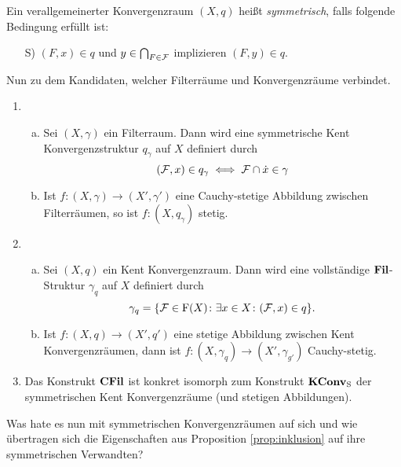 \begin{defn}
  Ein verallgemeinerter Konvergenzraum $(X,q)$ heißt \emph{symmetrisch}, falls folgende Bedingung erfüllt ist:
  \begin{enumerate}[S1)]
    \item[S)] $(F,x) \in q$ und $y \in \bigcap_{F \in \mathcal{F}}$ implizieren $(F, y) \in q$.
  \end{enumerate}
\end{defn}

Nun zu dem Kandidaten, welcher Filterräume und Konvergenzräume verbindet.

\begin{prop}
  \begin{enumerate}[1)]
    \item \begin{enumerate}[a)]  
        \item Sei $(X, \gamma)$ ein Filterraum. Dann wird eine symmetrische Kent Konvergenzstruktur $q_\gamma$ auf $X$ definiert durch
          $$
          (\mathcal{F}, x) \in q_\gamma \iff \mathcal{F} \cap \dot x \in \gamma
          $$
        \item Ist $f \colon (X, \gamma) \to (X', \gamma')$ eine Cauchy-stetige Abbildung zwischen Filterräumen, so ist $f \colon (X, q_\gamma)$ stetig.
      \end{enumerate}
    \item \begin{enumerate}[a)]
        \item Sei $(X, q)$ ein Kent Konvergenzraum. Dann wird eine vollständige $\mathbf{Fil}$-Struktur $\gamma_q$ auf $X$ definiert durch
          $$
          \gamma_q = \{ \mathcal{F} \in \mathrm{F}(X) \colon \exists x \in X \colon (\mathcal{F}, x ) \in q \}.
          $$
        \item Ist $f \colon (X, q) \to (X', q')$ eine stetige Abbildung zwischen Kent Konvergenzräumen, dann ist $f \colon (X, \gamma_q) \to (X', \gamma_{g'})$ Cauchy-stetig.
      \end{enumerate}
    \item Das Konstrukt $\mathbf{CFil}$ ist konkret isomorph zum Konstrukt $\mathbf{KConv}_{\mathrm{S}}$ der symmetrischen Kent Konvergenzräume (und stetigen Abbildungen).
  \end{enumerate}
\end{prop}

Was hate es nun mit symmetrischen Konvergenzräumen auf sich und wie übertragen sich die Eigenschaften aus Proposition \ref{prop:inklusion} auf ihre symmetrischen Verwandten?

